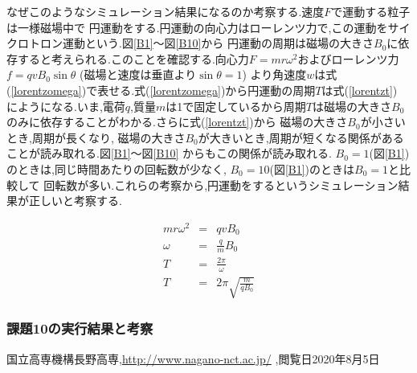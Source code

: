 \documentclass[a4j]{jarticle}
\begin{document}
          なぜこのようなシミュレーション結果になるのか考察する.速度\mbox{\boldmath $F$}で運動する粒子は一様磁場中で
          円運動をする.円運動の向心力はローレンツ力で,この運動をサイクロトロン運動という.図\ref{B1}～図\ref{B10}から
          円運動の周期は磁場の大きさ$B_0$に依存すると考えられる.このことを確認する.向心力$F=mr \omega^2$およびローレンツ力$f=qvB_0 \sin \theta$
          (磁場と速度は垂直より$\sin \theta =1$)
          より角速度$w$は式(\ref{lorentzomega})で表せる.式(\ref{lorentzomega})から円運動の周期$T$は式(\ref{lorentzt})
          にようになる.いま,電荷$q$,質量$m$は1で固定しているから周期$T$は磁場の大きさ$B_0$のみに依存することがわかる.さらに式(\ref{lorentzt})から
          磁場の大きさ$B_0$が小さいとき,周期が長くなり, 磁場の大きさ$B_0$が大きいとき,周期が短くなる関係があることが読み取れる.図\ref{B1}～図\ref{B10}
          からもこの関係が読み取れる. $B_0=1$(図\ref{B1})のときは,同じ時間あたりの回転数が少なく, $B_0=10$(図\ref{B1})のときは$B_0=1$と比較して
          回転数が多い.これらの考察から,円運動をするというシミュレーション結果が正しいと考察する.

          \begin{eqnarray}
            mr \omega^2 &=& qvB_0 \\
            \omega &=& \frac{q}{m}B_0 \label{lorentzomega} \\
            T &=& \frac{2 \pi}{\omega} \\
            T &=& 2 \pi \sqrt{\frac{m}{qB_0}} \label{lorentzt}
          \end{eqnarray}             


      \subsubsection{課題10の実行結果と考察}


        \begin{thebibliography}{9}
            国立高専機構長野高専,\url{http://www.nagano-nct.ac.jp/} ,閲覧日2020年8月5日
          \end{thebibliography}
\end{document}

